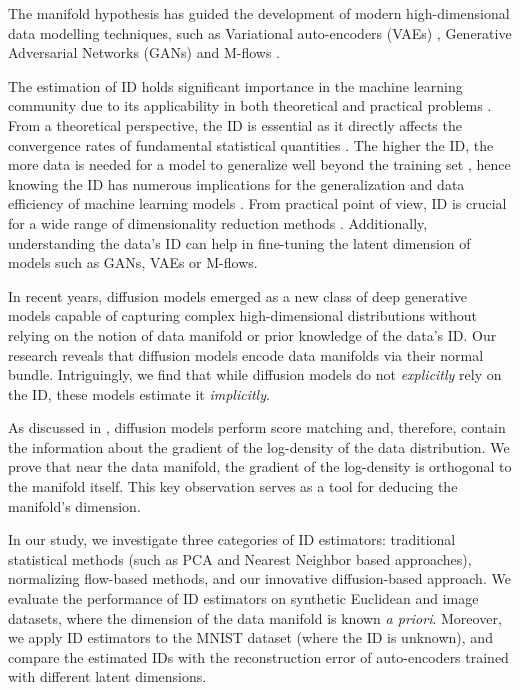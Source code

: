 The manifold hypothesis has guided the development of modern high-dimensional data modelling techniques, such as Variational auto-encoders (VAEs) \cite{vae}, Generative Adversarial Networks (GANs) \cite{gan} and M-flows \cite{brehmer2020flows}. 

The estimation of ID holds significant importance in the machine learning community due to its applicability in both theoretical and practical problems \cite{campadelli2015intrinsic}. From a theoretical perspective, the ID is essential as it directly affects the convergence rates of fundamental statistical quantities \cite{weed2019sharp}. The higher the ID, the more data is needed for a model to generalize well beyond the training set \cite{campadelli2015intrinsic, pope2021intrinsic}, hence knowing the ID has numerous implications for the generalization and data efficiency of machine learning models \cite{kim2019kde, kpotufe2011knn}.  From practical point of view, ID is crucial for a wide range of dimensionality reduction methods \cite{campadelli2015intrinsic}.  Additionally, understanding the data's ID can help in fine-tuning the latent dimension of models such as GANs, VAEs or M-flows. 


In recent years, diffusion models \cite{diffusion_models, ddpm} emerged as a new class of deep generative models capable of capturing complex high-dimensional distributions without relying on the notion of data manifold or prior knowledge of the data's ID. Our research reveals that diffusion models encode data manifolds via their normal bundle. Intriguingly, we find that while diffusion models do not \textit{explicitly} rely on the ID, these models estimate it \textit{implicitly}.

As discussed in \cite{song2020score, ddpm}, diffusion models perform score matching \cite{score_matching} and, therefore, contain the information about the gradient of the log-density of the data distribution. We prove that near the data manifold, the gradient of the log-density is orthogonal to the manifold itself. This key observation serves as a tool for deducing the manifold's dimension.

In our study, we investigate three categories of ID estimators: traditional statistical methods (such as PCA and Nearest Neighbor based approaches), normalizing flow-based methods, and our innovative diffusion-based approach. We evaluate the performance of ID estimators  on synthetic Euclidean and image datasets, where the dimension of the data manifold is known \textit{a priori}. Moreover, we apply ID estimators to the MNIST dataset \cite{mnist} (where the ID is unknown), and compare the estimated IDs with the reconstruction error of auto-encoders trained with different latent dimensions. 

